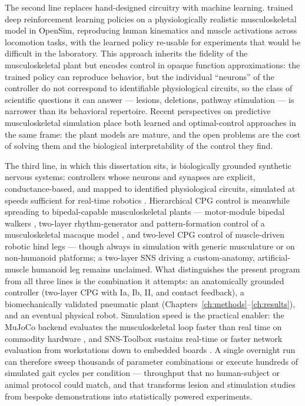 The second line replaces hand-designed circuitry with machine learning. \citet{song_deep_2021} trained deep reinforcement learning policies on a physiologically realistic musculoskeletal model in OpenSim, reproducing human kinematics and muscle activations across locomotion tasks, with the learned policy re-usable for experiments that would be difficult in the laboratory. This approach inherits the fidelity of the musculoskeletal plant but encodes control in opaque function approximations: the trained policy can reproduce behavior, but the individual ``neurons'' of the controller do not correspond to identifiable physiological circuits, so the class of scientific questions it can answer --- lesions, deletions, pathway stimulation --- is narrower than its behavioral repertoire. Recent perspectives on predictive musculoskeletal simulation \citep{degroote_perspective_2021} place both learned and optimal-control approaches in the same frame: the plant models are mature, and the open problems are the cost of solving them and the biological interpretability of the control they find.

The third line, in which this dissertation sits, is biologically grounded synthetic nervous systems: controllers whose neurons and synapses are explicit, conductance-based, and mapped to identified physiological circuits, simulated at speeds sufficient for real-time robotics \citep{nourse_sns_2023}. Hierarchical CPG control is meanwhile spreading to bipedal-capable musculoskeletal plants --- motor-module bipedal walkers \citep{ichimura_pathological_2019}, two-layer rhythm-generator and pattern-formation control of a musculoskeletal macaque model \citep{nishizaki_gait_2026}, and two-level CPG control of muscle-driven robotic hind legs \citep{fukuoka_autonomous_2021} --- though always in simulation with generic musculature or on non-humanoid platforms; a two-layer SNS driving a custom-anatomy, artificial-muscle humanoid leg remains unclaimed. What distinguishes the present program from all three lines is the combination it attempts: an anatomically grounded controller (two-layer CPG with Ia, Ib, II, and contact feedback), a biomechanically validated pneumatic plant (Chapters~\ref{ch:methods}--\ref{ch:results}), and an eventual physical robot. Simulation speed is the practical enabler: the MuJoCo backend evaluates the musculoskeletal loop faster than real time on commodity hardware \citep{todorov_mujoco_2012, caggiano_myosuite_2022}, and SNS-Toolbox sustains real-time or faster network evaluation from workstations down to embedded boards \citep{nourse_sns_2023}. A single overnight run can therefore sweep thousands of parameter combinations or execute hundreds of simulated gait cycles per condition --- throughput that no human-subject or animal protocol could match, and that transforms lesion and stimulation studies from bespoke demonstrations into statistically powered experiments.

